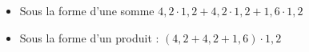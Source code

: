%
%
    \begin{itemize}[label=]
        \item  Sous la forme d'une somme $4,2 \cdot 1,2 + 4,2 \cdot 1,2 + 1,6 \cdot 1,2$
        \item Sous la forme d'un produit : $(4,2 + 4,2 + 1,6) \cdot 1,2$
    \end{itemize}

